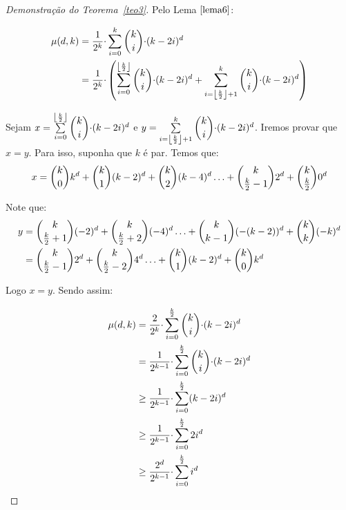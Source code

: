 \documentclass[12pt]{article}
\begin{document}
{ \begin{proof}[Demonstração do Teorema~\ref{teo3}]
 	Pelo Lema $\ref{lema6}$:
 	
 	\begin{align}
 		\begin{split} 
 			 \mu(d, k) &= \dfrac{1}{2^k} {\cdot} \sum\limits_{i = 0}^{k}\escolhe{k}{i} {\cdot} (k - 2i)^{d} \\
 			 &= \dfrac{1}{2^k} {\cdot} \left(  \sum\limits_{i = 0}^{ \blfloor \frac{k}{2} \brfloor  }\escolhe{k}{i} {\cdot} (k - 2i)^{d} +   \sum\limits_{i = \blfloor \frac{k}{2} \brfloor + 1  }^{k}\escolhe{k}{i} {\cdot} (k - 2i)^{d} \right)
 		\end{split} 
 	\end{align}
 	
 	Sejam $x = \sum\limits_{i = 0}^{ \blfloor \frac{k}{2} \brfloor  }\escolhe{k}{i} {\cdot} (k - 2i)^{d} $ e $y = \sum\limits_{i = \blfloor \frac{k}{2} \brfloor + 1  }^{k}\escolhe{k}{i} {\cdot} (k - 2i)^{d}$. Iremos provar que $x=y$. Para isso, suponha que $k$ é par. Temos que: 
 	\begin{align}
 		\begin{split}  
 			x = \escolhe{k}{0}k^{d} + \escolhe{k}{1}(k-2)^{d} + \escolhe{k}{2}(k-4)^{d} \ldots + \escolhe{k}{\frac{k}{2} - 1}2^{d} + \escolhe{k}{\frac{k}{2}}0^{d}
 		\end{split} 
 	\end{align}
 	
 	Note que: 
 	\begin{align}
 		\begin{split}  
 			y &= \escolhe{k}{\frac{k}{2} + 1}(-2)^{d} + \escolhe{k}{\frac{k}{2} + 2}(-4)^{d} \ldots + \escolhe{k}{k-1}(-(k-2))^{d} + \escolhe{k}{k}(-k)^{d} \\
 			&= \escolhe{k}{\frac{k}{2} - 1}2^{d} + \escolhe{k}{\frac{k}{2} - 2}4^{d} \ldots + \escolhe{k}{1}(k-2)^{d} + \escolhe{k}{0}k^{d}
 		\end{split} 
 	\end{align}
 	
 	Logo $x = y$. Sendo assim:
 	
 	\begin{align}
 		\begin{split}
 			\label{l6_4} 
 			\mu(d, k) &= \dfrac{2}{2^k} {\cdot}  \sum\limits_{i = 0}^{  \frac{k}{2}   }\escolhe{k}{i} {\cdot} (k - 2i)^{d}  \\
 			&= \dfrac{1}{2^{k-1}} {\cdot}  \sum\limits_{i = 0}^{  \frac{k}{2}   }\escolhe{k}{i} {\cdot} (k - 2i)^{d} \\
 			&\geq \dfrac{1}{2^{k-1}} {\cdot}  \sum\limits_{i = 0}^{  \frac{k}{2}   }(k - 2i)^{d} \\
 			&\geq \dfrac{1}{2^{k-1}} {\cdot}  \sum\limits_{i = 0}^{  \frac{k}{2}   }2i^{d} \\
 			&\geq \dfrac{2^{d}}{2^{k-1}} {\cdot}  \sum\limits_{i = 0}^{  \frac{k}{2}   }i^{d}
 		\end{split} 
 	\end{align}
 	 

\end{proof}}
\end{document}

